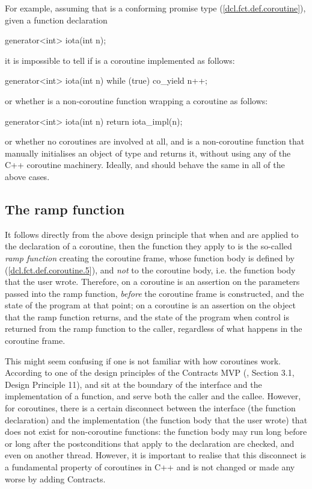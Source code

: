 For example, assuming that  is a conforming promise type (\href{https://eel.is/c++draft/dcl.fct.def.coroutine}{[dcl.fct.def.coroutine]}), given a function declaration 
\begin{codeblock}
generator<int> iota(int n); 
\end{codeblock}
it is impossible to tell if  is a coroutine implemented as follows:
\begin{codeblock}
generator<int> iota(int n) {
  while (true)
    co_yield n++;
}
\end{codeblock}
or whether  is a non-coroutine function wrapping a coroutine as follows:
\begin{codeblock}
generator<int> iota(int n) {
  return iota_impl(n);
}
\end{codeblock}
or whether no coroutines are involved at all, and  is a non-coroutine function that manually initialises an object of type  and returns it, without using any of the C++ coroutine machinery. Ideally,  and  should behave the same in all of the above cases.

\subsection{The ramp function}

It follows directly from the above design principle that when  and  are applied to the declaration of a coroutine, then the function they apply to is the so-called \emph{ramp function} creating the coroutine frame, whose function body is defined by ([\href{https://eel.is/c++draft/dcl.fct.def.coroutine#5}{dcl.fct.def.coroutine.5}]), and \emph{not} to the coroutine body, i.e. the function body that the user wrote. Therefore,  on a coroutine is an assertion on the parameters passed into the ramp function, \emph{before} the coroutine frame is constructed, and the state of the program at that point;  on a coroutine is an assertion on the object that the ramp function returns, and the state of the program when control is returned from the ramp function to the caller, regardless of what happens in the coroutine frame.

This might seem confusing if one is not familiar with how coroutines work. According to one of the design principles of the Contracts MVP (\cite{P2900R8}, Section 3.1, Design Principle 11),  and  sit at the boundary of the interface and the implementation of a function, and serve both  the caller and the callee. However, for coroutines, there is a certain disconnect between the interface (the function declaration) and the implementation (the function body that the user wrote) that does not exist for non-coroutine functions: the function body may run long before or long after the postconditions that apply to the declaration are checked, and even on another thread. However, it is important to realise that this disconnect is a fundamental property of coroutines in C++ and is not changed or made any worse by adding Contracts.

